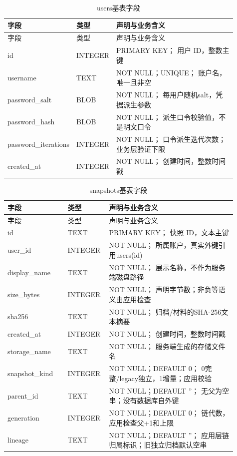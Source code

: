 \begin{longtable}{L{0.25\linewidth}L{0.13\linewidth}L{0.53\linewidth}}
\caption{users基表字段}\label{tab:db-users}\\\toprule 字段 & 类型 & 声明与业务含义\\\midrule\endfirsthead
\toprule 字段 & 类型 & 声明与业务含义\\\midrule\endhead
id & INTEGER & PRIMARY KEY； 用户 ID，整数主键\\
username & TEXT & NOT NULL；UNIQUE； 账户名，唯一且非空\\
password\_salt & BLOB & NOT NULL； 每用户随机salt，凭据派生参数\\
password\_hash & BLOB & NOT NULL； 派生口令校验值，不是明文口令\\
password\_iterations & INTEGER & NOT NULL； 口令派生迭代次数；业务层验证下限\\
created\_at & INTEGER & NOT NULL； 创建时间，整数时间戳\\
\bottomrule\end{longtable}

\begin{longtable}{L{0.25\linewidth}L{0.13\linewidth}L{0.53\linewidth}}
\caption{snapshots基表字段}\label{tab:db-snapshots}\\\toprule 字段 & 类型 & 声明与业务含义\\\midrule\endfirsthead
\toprule 字段 & 类型 & 声明与业务含义\\\midrule\endhead
id & TEXT & PRIMARY KEY； 快照 ID，文本主键\\
user\_id & INTEGER & NOT NULL； 所属账户，真实外键引用users(id)\\
display\_name & TEXT & NOT NULL； 展示名称，不作为服务端磁盘路径\\
size\_bytes & INTEGER & NOT NULL； 声明字节数；非负等语义由应用检查\\
sha256 & TEXT & NOT NULL； 归档/材料的SHA-256文本摘要\\
created\_at & INTEGER & NOT NULL； 创建时间，整数时间戳\\
storage\_name & TEXT & NOT NULL； 服务端生成的存储文件名\\
snapshot\_kind & INTEGER & NOT NULL；DEFAULT 0； 0完整/legacy独立，1增量；应用校验\\
parent\_id & TEXT & NOT NULL；DEFAULT ''； 无父为空串；没有数据库自外键\\
generation & INTEGER & NOT NULL；DEFAULT 0； 链代数，应用检查父+1和上限\\
lineage & TEXT & NOT NULL；DEFAULT ''； 应用层链归属标识；旧独立归档默认空串\\
\bottomrule\end{longtable}

